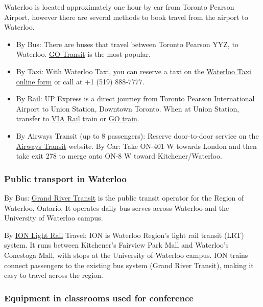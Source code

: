 Waterloo is located approximately one hour by car from Toronto Pearson Airport, however there are several methods to book travel from the airport to Waterloo.

\begin{itemize}
\item By Bus: There are buses that travel between Toronto Pearson YYZ, to Waterloo. \href{https://www.gotransit.com/en}{GO Transit} is the most popular.
\item By Taxi: With Waterloo Taxi, you can reserve a taxi on the \href{https://waterlootaxi.ca/mobile/airport.php}{Waterloo Taxi online form} or call at +1 (519) 888-7777.
\item By Rail: UP Express is a direct journey from Toronto Pearson International Airport to Union Station, Downtown Toronto. When at Union Station, transfer to \href{https://www.viarail.ca/en}{VIA Rail} train or \href{https://www.gotransit.com/en}{GO train}.
\item By Airways Transit (up to 8 passengers): Reserve door-to-door service on the \href{https://www.airwaystransit.com/Private-Service/}{Airways Transit} website.
By Car: Take ON-401 W towards London and then take exit 278 to merge onto ON-8 W toward Kitchener/Waterloo.
\end{itemize}



\subsubsection{Public transport in Waterloo}

By Bus: \href{https://www.grt.ca/en/index.aspx}{Grand River Transit} is the public transit operator for the Region of Waterloo, Ontario. It operates daily bus serves across Waterloo and the University of Waterloo campus.

By \href{https://www.grt.ca/en/ion-light-rail.aspx}{ION Light Rail} Travel: ION is Waterloo Region’s light rail transit (LRT) system. It runs between Kitchener’s Fairview Park Mall and Waterloo’s Conestoga Mall, with stops at the University of Waterloo campus. ION trains connect passengers to the existing bus system (Grand River Transit), making it easy to travel across the region.



\subsubsection{Equipment in classrooms used for conference}

